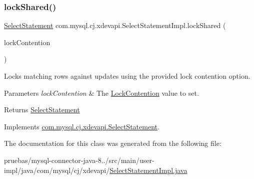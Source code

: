 \mbox{\label{classcom_1_1mysql_1_1cj_1_1xdevapi_1_1_select_statement_impl_a94383dd2bc539f35e3faa4de023248a1}} 
\subsubsection{\texorpdfstring{lock\+Shared()}{lockShared()}\hspace{0.1cm}{\footnotesize\ttfamily [2/2]}}
{\footnotesize\ttfamily \mbox{\hyperlink{interfacecom_1_1mysql_1_1cj_1_1xdevapi_1_1_select_statement}{Select\+Statement}} com.\+mysql.\+cj.\+xdevapi.\+Select\+Statement\+Impl.\+lock\+Shared (\begin{DoxyParamCaption}\item[{Lock\+Contention}]{lock\+Contention }\end{DoxyParamCaption})}

Locks matching rows against updates using the provided lock contention option.


\begin{DoxyParams}{Parameters}
{\em lock\+Contention} & The \mbox{\hyperlink{}{Lock\+Contention}} value to set. \\
\hline
\end{DoxyParams}
\begin{DoxyReturn}{Returns}
\mbox{\hyperlink{interfacecom_1_1mysql_1_1cj_1_1xdevapi_1_1_select_statement}{Select\+Statement}} 
\end{DoxyReturn}


Implements \mbox{\hyperlink{interfacecom_1_1mysql_1_1cj_1_1xdevapi_1_1_select_statement_a2ada4b9bb1be4e07ef8593ff9e777ad0}{com.\+mysql.\+cj.\+xdevapi.\+Select\+Statement}}.



The documentation for this class was generated from the following file\+:\begin{DoxyCompactItemize}
\item 
pruebas/mysql-\/connector-\/java-\/8../src/main/user-\/impl/java/com/mysql/cj/xdevapi/\mbox{\hyperlink{_select_statement_impl_8java}{Select\+Statement\+Impl.\+java}}\end{DoxyCompactItemize}
